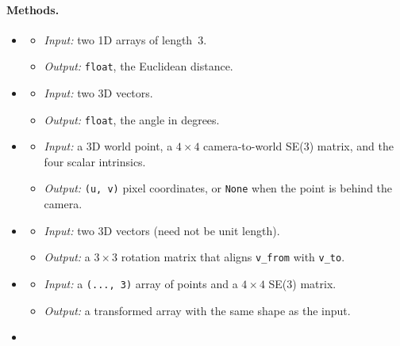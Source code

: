 \paragraph{Methods.}
\begin{itemize}[leftmargin=1.5em]
\item {}
  \begin{itemize}
  \item \emph{Input:} two 1D arrays of length~3.
  \item \emph{Output:} \texttt{float}, the Euclidean distance.
  \end{itemize}
\item {}
  \begin{itemize}
  \item \emph{Input:} two 3D vectors.
  \item \emph{Output:} \texttt{float}, the angle in degrees.
  \end{itemize}
\item {}
  \begin{itemize}
  \item \emph{Input:} a 3D world point, a $4 \times 4$ camera-to-world SE(3) matrix, and the four scalar intrinsics.
  \item \emph{Output:} \texttt{(u, v)} pixel coordinates, or \texttt{None} when the point is behind the camera.
  \end{itemize}
\item {}
  \begin{itemize}
  \item \emph{Input:} two 3D vectors (need not be unit length).
  \item \emph{Output:} a $3 \times 3$ rotation matrix that aligns \texttt{v\_from} with \texttt{v\_to}.
  \end{itemize}
\item {}
  \begin{itemize}
  \item \emph{Input:} a \texttt{(..., 3)} array of points and a $4 \times 4$ SE(3) matrix.
  \item \emph{Output:} a transformed array with the same shape as the input.
  \end{itemize}
\item {}

\end{itemize}
